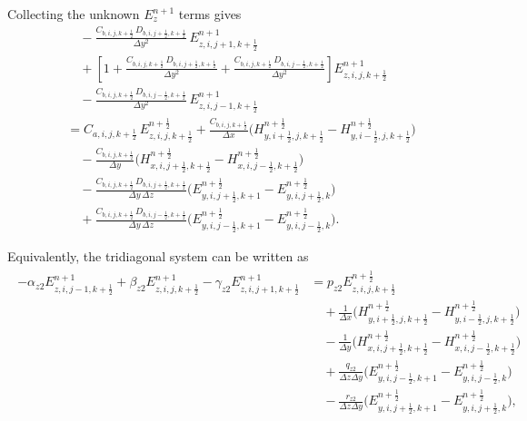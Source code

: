 \documentclass{article}
\numberwithin{equation}{section}
\numberwithin{figure}{section}
\begin{document}
Collecting the unknown $E_{z}^{n+1}$ terms gives
\begin{equation}
    \begin{aligned}
         & \quad -\frac{C_{b,i,j,k+\tfrac12}\,D_{b,i,j+\tfrac12,k+\tfrac12}}{\Delta y^2}\, E_{z,i,j+1,k+\tfrac12}^{n+1}                                                                                     \\
         & \quad + \left[1+\frac{C_{b,i,j,k+\tfrac12}\,D_{b,i,j+\tfrac12,k+\tfrac12}}{\Delta y^2} +\frac{C_{b,i,j,k+\tfrac12}\,D_{b,i,j-\tfrac12,k+\tfrac12}}{\Delta y^2}\right] E_{z,i,j,k+\tfrac12}^{n+1} \\
         & \quad - \frac{C_{b,i,j,k+\tfrac12}\,D_{b,i,j-\tfrac12,k+\tfrac12}}{\Delta y^2}\, E_{z,i,j-1,k+\tfrac12}^{n+1}                                                                                    \\
         & = C_{a,i,j,k+\tfrac12}\, E_{z,i,j,k+\tfrac12}^{n+\frac12} + \frac{C_{b,i,j,k+\tfrac12}}{\Delta x} \Big(H_{y,i+\tfrac12,j,k+\tfrac12}^{n+\frac12}-H_{y,i-\tfrac12,j,k+\tfrac12}^{n+\frac12}\Big)  \\
         & \quad - \frac{C_{b,i,j,k+\tfrac12}}{\Delta y} \Big(H_{x,i,j+\tfrac12,k+\tfrac12}^{n+\frac12}-H_{x,i,j-\tfrac12,k+\tfrac12}^{n+\frac12}\Big)                                                      \\
         & \quad - \frac{C_{b,i,j,k+\tfrac12}\,D_{b,i,j+\tfrac12,k+\tfrac12}}{\Delta y\,\Delta z} \Big(E_{y,i,j+\tfrac12,k+1}^{n+\frac12}-E_{y,i,j+\tfrac12,k}^{n+\frac12}\Big)                             \\
         & \quad + \frac{C_{b,i,j,k+\tfrac12}\,D_{b,i,j-\tfrac12,k+\tfrac12}}{\Delta y\,\Delta z} \Big(E_{y,i,j-\tfrac12,k+1}^{n+\frac12}-E_{y,i,j-\tfrac12,k}^{n+\frac12}\Big).
    \end{aligned}
\end{equation}

Equivalently, the tridiagonal system can be written as
\begin{align}
    \begin{split}
        -\alpha_{z2}E_{z,i,j-1,k+\tfrac12}^{n+1} + \beta_{z2}E_{z,i,j,k+\tfrac12}^{n+1} - \gamma_{z2}E_{z,i,j+1,k+\tfrac12}^{n+1}
         & = p_{z2}E_{z,i,j,k+\tfrac12}^{n+\frac12}                                                                               \\
         & \quad +\frac{1}{\Delta x}\Big(H_{y,i+\tfrac12,j,k+\tfrac12}^{n+\frac12}-H_{y,i-\tfrac12,j,k+\tfrac12}^{n+\frac12}\Big) \\
         & \quad -\frac{1}{\Delta y}\Big(H_{x,i,j+\tfrac12,k+\tfrac12}^{n+\frac12}-H_{x,i,j-\tfrac12,k+\tfrac12}^{n+\frac12}\Big) \\
         & \quad +\frac{q_{z2}}{\Delta z\Delta y}\Big(E_{y,i,j-\tfrac12,k+1}^{n+\frac12}-E_{y,i,j-\tfrac12,k}^{n+\frac12}\Big)    \\
         & \quad -\frac{r_{z2}}{\Delta z\Delta y}\Big(E_{y,i,j+\tfrac12,k+1}^{n+\frac12}-E_{y,i,j+\tfrac12,k}^{n+\frac12}\Big),
    \end{split}
    \label{eq:second-e-ez-adi-tridiagonal}
\end{align}
\end{document}
